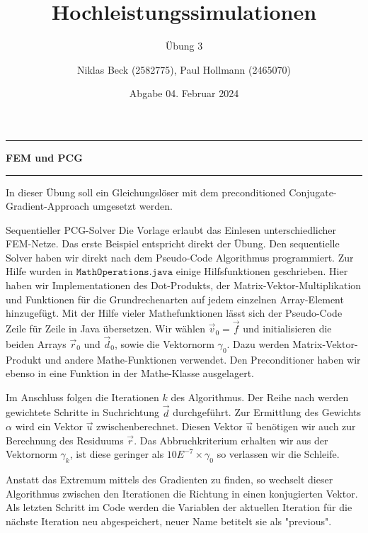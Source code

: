 \documentclass[
ngerman,
subtask=ruled %
]{tudaexercise}
\begin{document}
	
	\title[Übung Hochleistungssimulationen]{Hochleistungssimulationen}
	\subtitle{\"Ubung 3}
	\author{Niklas Beck (2582775), Paul Hollmann (2465070)}
	\date{Abgabe 04. Februar 2024}
	\maketitle
	
	\hrule
	{\Large \textbf{ FEM und PCG }} \vspace{2mm}
	\hrule

	In dieser Übung soll ein Gleichungslöser mit dem preconditioned Conjugate-Gradient-Approach umgesetzt werden.

	\begin{task}{Sequentieller PCG-Solver}
		Die Vorlage erlaubt das Einlesen unterschiedlicher FEM-Netze. Das erste Beispiel entspricht direkt der Übung.
		Den sequentielle Solver haben wir direkt nach dem Pseudo-Code Algorithmus programmiert. Zur Hilfe wurden in $\mathtt{MathOperations.java}$ einige Hilfsfunktionen geschrieben. Hier haben wir Implementationen des Dot-Produkts, der Matrix-Vektor-Multiplikation und Funktionen für die Grundrechenarten auf jedem einzelnen Array-Element hinzugefügt.
		Mit der Hilfe vieler Mathefunktionen lässt sich der Pseudo-Code Zeile für Zeile in Java übersetzen.
		Wir wählen $\vec{v}_0 = \vec{f}$ und initialisieren die beiden Arrays $\vec{r}_0$ und $\vec{d}_0$, sowie die Vektornorm $\gamma_0$. Dazu werden Matrix-Vektor-Produkt und andere Mathe-Funktionen verwendet. Den Preconditioner haben wir ebenso in eine Funktion in der Mathe-Klasse ausgelagert.
		
		Im Anschluss folgen die Iterationen $k$ des Algorithmus. Der Reihe nach werden gewichtete Schritte in Suchrichtung $\vec{d}$ durchgeführt. Zur Ermittlung des Gewichts $\alpha$ wird ein Vektor $\vec{u}$ zwischenberechnet. Diesen Vektor $\vec{u}$ benötigen wir auch zur Berechnung des Residuums $\vec{r}$.
		Das Abbruchkriterium erhalten wir aus der Vektornorm $\gamma_k$, ist diese geringer als $10 E^{-7} \times \gamma_0$ so verlassen wir die Schleife.
		
		Anstatt das Extremum mittels des Gradienten zu finden, so wechselt dieser Algorithmus zwischen den Iterationen die Richtung in einen konjugierten Vektor.
		Als letzten Schritt im Code werden die Variablen der aktuellen Iteration für die nächste Iteration neu abgespeichert, neuer Name betitelt sie als "previous".
	\end{task}	
\end{document}
